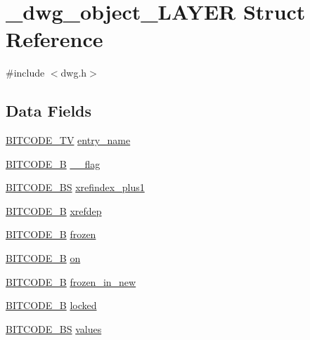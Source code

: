 \hypertarget{struct__dwg__object__LAYER}{\section{\-\_\-dwg\-\_\-object\-\_\-\-L\-A\-Y\-E\-R \-Struct \-Reference}
\label{struct__dwg__object__LAYER}
}


{\ttfamily \#include $<$dwg.\-h$>$}

\subsection*{\-Data \-Fields}
\begin{DoxyCompactItemize}
\item 
\hyperlink{dwg_8h_a2a7e040c6e36ca039b03608679ecaf7c}{\-B\-I\-T\-C\-O\-D\-E\-\_\-\-T\-V} \hyperlink{struct__dwg__object__LAYER_aed8aa63bd57f324d6f3f3b3e4f614a82}{entry\-\_\-name}
\item 
\hyperlink{dwg_8h_ab533b1f62d9086749e3bb5b67e9f224e}{\-B\-I\-T\-C\-O\-D\-E\-\_\-\-B} \hyperlink{struct__dwg__object__LAYER_ac57e746737fffd4f1933e172b1d2ff0e}{\-\_\-\_\-flag}
\item 
\hyperlink{dwg_8h_a94297606fbd4a4ff97e8add284af0809}{\-B\-I\-T\-C\-O\-D\-E\-\_\-\-B\-S} \hyperlink{struct__dwg__object__LAYER_a60286e3efbbdc1eaea161e9683ad3c6e}{xrefindex\-\_\-plus1}
\item 
\hyperlink{dwg_8h_ab533b1f62d9086749e3bb5b67e9f224e}{\-B\-I\-T\-C\-O\-D\-E\-\_\-\-B} \hyperlink{struct__dwg__object__LAYER_af83f6231255df31a31fce5033a9f4cb4}{xrefdep}
\item 
\hyperlink{dwg_8h_ab533b1f62d9086749e3bb5b67e9f224e}{\-B\-I\-T\-C\-O\-D\-E\-\_\-\-B} \hyperlink{struct__dwg__object__LAYER_ac20f26967dcc147b642593dd42d24ad0}{frozen}
\item 
\hyperlink{dwg_8h_ab533b1f62d9086749e3bb5b67e9f224e}{\-B\-I\-T\-C\-O\-D\-E\-\_\-\-B} \hyperlink{struct__dwg__object__LAYER_a6a0dc4c11eefa7e4342598e48e90bc74}{on}
\item 
\hyperlink{dwg_8h_ab533b1f62d9086749e3bb5b67e9f224e}{\-B\-I\-T\-C\-O\-D\-E\-\_\-\-B} \hyperlink{struct__dwg__object__LAYER_aec12bdf1cc1775b1818d0581a9fd519b}{frozen\-\_\-in\-\_\-new}
\item 
\hyperlink{dwg_8h_ab533b1f62d9086749e3bb5b67e9f224e}{\-B\-I\-T\-C\-O\-D\-E\-\_\-\-B} \hyperlink{struct__dwg__object__LAYER_ae58249b2eea789e12386d80e9a6d1ced}{locked}
\item 
\hyperlink{dwg_8h_a94297606fbd4a4ff97e8add284af0809}{\-B\-I\-T\-C\-O\-D\-E\-\_\-\-B\-S} \hyperlink{struct__dwg__object__LAYER_aefae1d764f9bc6096c0aeac1175b49fb}{values}

\end{DoxyCompactItemize}
